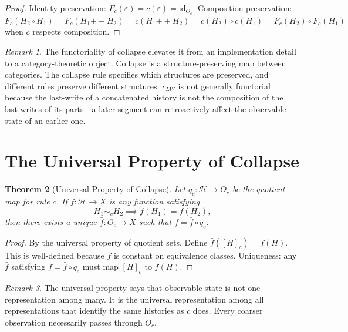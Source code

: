 \documentclass[12pt, a4paper, openany]{book}
\theoremstyle{plain}
\newtheorem{theorem}{Theorem}[chapter]
\theoremstyle{definition}
\theoremstyle{remark}
\newtheorem{remark}[theorem]{Remark}
\newcommand{\calH}{\mathcal{H}}
\begin{document}
\begin{proof}
Identity preservation: $F_c(\varepsilon) = c(\varepsilon) = \mathrm{id}_{O_c}$.
Composition preservation: $F_c(H_2 \circ H_1) = F_c(H_1 \mathbin{++} H_2) =
c(H_1 \mathbin{++} H_2) = c(H_2) \circ c(H_1) = F_c(H_2) \circ F_c(H_1)$ when
$c$ respects composition.
\end{proof}

\begin{remark}
The functoriality of collapse elevates it from an implementation detail to a
category-theoretic object. Collapse is a structure-preserving map between
categories. The collapse rule specifies which structures are preserved, and
different rules preserve different structures. $c_{LW}$ is not generally functorial
because the last-write of a concatenated history is not the composition of the
last-writes of its parts---a later segment can retroactively affect the observable
state of an earlier one.
\end{remark}

\section{The Universal Property of Collapse}

\begin{theorem}[Universal Property of Collapse]
Let $q_c : \calH \to O_c$ be the quotient map for rule $c$. If $f : \calH \to X$
is any function satisfying
\[
H_1 \sim_c H_2 \implies f(H_1) = f(H_2),
\]
then there exists a unique $\bar{f} : O_c \to X$ such that $f = \bar{f} \circ q_c$.
\end{theorem}

\begin{proof}
By the universal property of quotient sets. Define $\bar{f}([H]_c) = f(H)$.
This is well-defined because $f$ is constant on equivalence classes. Uniqueness:
any $\bar{f}$ satisfying $f = \bar{f} \circ q_c$ must map $[H]_c$ to $f(H)$.
\end{proof}

\begin{remark}
The universal property says that observable state is not one representation among
many. It is the universal representation among all representations that identify
the same histories as $c$ does. Every coarser observation necessarily passes
through $O_c$.
\end{remark}

\end{document}
